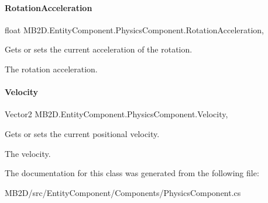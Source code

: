 \paragraph{\texorpdfstring{Rotation\+Acceleration}{RotationAcceleration}}
{\footnotesize\ttfamily float M\+B2\+D.\+Entity\+Component.\+Physics\+Component.\+Rotation\+Acceleration\hspace{0.3cm}{\ttfamily [get]}, {\ttfamily [set]}}



Gets or sets the current acceleration of the rotation. 

The rotation acceleration.\hypertarget{class_m_b2_d_1_1_entity_component_1_1_physics_component_a67477d82a7e9555cb9d08351c8ffe24f}{}\label{class_m_b2_d_1_1_entity_component_1_1_physics_component_a67477d82a7e9555cb9d08351c8ffe24f} 
\paragraph{\texorpdfstring{Velocity}{Velocity}}
{\footnotesize\ttfamily Vector2 M\+B2\+D.\+Entity\+Component.\+Physics\+Component.\+Velocity\hspace{0.3cm}{\ttfamily [get]}, {\ttfamily [set]}}



Gets or sets the current positional velocity. 

The velocity.

The documentation for this class was generated from the following file\+:\begin{DoxyCompactItemize}
\item 
M\+B2\+D/src/\+Entity\+Component/\+Components/Physics\+Component.\+cs\end{DoxyCompactItemize}
